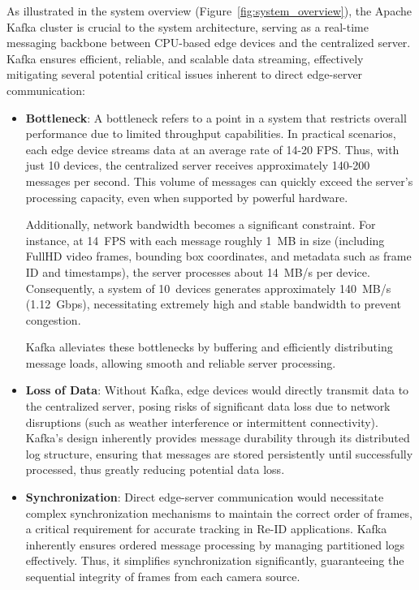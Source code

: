 As illustrated in the system overview (Figure~\ref{fig:system_overview}), the Apache Kafka cluster is crucial to the system architecture, serving as a real-time messaging backbone between CPU-based edge devices and the centralized server. Kafka ensures efficient, reliable, and scalable data streaming, effectively mitigating several potential critical issues inherent to direct edge-server communication:

\begin{itemize}
\item \textbf{Bottleneck}: A bottleneck refers to a point in a system that restricts overall performance due to limited throughput capabilities. In practical scenarios, each edge device streams data at an average rate of 14-20 FPS. Thus, with just 10 devices, the centralized server receives approximately 140-200 messages per second. This volume of messages can quickly exceed the server's processing capacity, even when supported by powerful hardware.

Additionally, network bandwidth becomes a significant constraint. For instance, at 14~FPS with each message roughly 1~MB in size (including FullHD video frames, bounding box coordinates, and metadata such as frame ID and timestamps), the server processes about 14~MB/s per device. Consequently, a system of 10~devices generates approximately 140~MB/s (1.12~Gbps), necessitating extremely high and stable bandwidth to prevent congestion.

Kafka alleviates these bottlenecks by buffering and efficiently distributing message loads, allowing smooth and reliable server processing.

\item \textbf{Loss of Data}: Without Kafka, edge devices would directly transmit data to the centralized server, posing risks of significant data loss due to network disruptions (such as weather interference or intermittent connectivity). Kafka's design inherently provides message durability through its distributed log structure, ensuring that messages are stored persistently until successfully processed, thus greatly reducing potential data loss.

\item \textbf{Synchronization}: Direct edge-server communication would necessitate complex synchronization mechanisms to maintain the correct order of frames, a critical requirement for accurate tracking in Re-ID applications. Kafka inherently ensures ordered message processing by managing partitioned logs effectively. Thus, it simplifies synchronization significantly, guaranteeing the sequential integrity of frames from each camera source.

\end{itemize}

